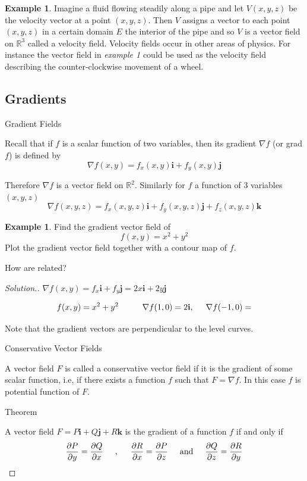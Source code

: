 \documentclass[11pt,a4paper]{article}
\theoremstyle{definition}
\newtheorem{exa}[thm]{Example}
\newenvironment{solution}
  {\renewcommand{\qedsymbol}{}\begin{proof}[\textit{Solution}.]}
  {\end{proof}}
\begin{document}
\begin{exa}
Imagine a fluid flowing steadily along a pipe and let $V(x,y,z)$ be the velocity vector at a point $(x,y,z)$. Then $V$ assigns a vector to each point $(x,y,z)$ in a certain domain $E$ the interior of the pipe and so $V$ is a vector field on $\mathbb{R}^3$ called a velocity field. Velocity fields occur in other areas of physics. For instance the vector field in \textit{example 1} could be used as the velocity field describing the counter-clockwise movement of a wheel.


\pagebreak
\end{exa}
{\color[wave]{485}\subsection{Gradients}}

{\color[wave]{485}Gradient Fields}


Recall that if $f$ is a scalar function of two variables, then its gradient $\nabla f$ (or grad $f$) is defined by $$\nabla f(x,y) = f_x(x,y)\textbf{i} + f_y(x,y) \textbf{j}$$

Therefore $\nabla f$ is a vector field on $\mathbb{R}^2$. Similarly for $f$ a function of 3 variables $(x,y,z)$ $$\nabla f(x,y,z) = f_x(x,y,z)\textbf{i} + f_y(x,y,z)\textbf{j} + f_z(x,y,z)\textbf{k}$$


\begin{exa}
Find the gradient vector field of $$f(x,y) = x^2 + y^2$$ Plot the gradient vector field together with a contour map of $f$.


How are related?
\end{exa}


\begin{solution}
$\displaystyle{\nabla f(x,y) = f_x\textbf{i} + f_y \textbf{j} = 2x\textbf{i} + 2y\textbf{j}}$

$$f(x,y) = x^2 + y^2\hspace{1cm} \nabla f(1,0) = 2\textbf{i},\hspace{0.5cm} \nabla f(-1,0)=$$


Note that the gradient vectors are perpendicular to the level curves.


{\color[wave]{485} Conservative Vector Fields}


A vector field $F$ is called a conservative vector field if it is the gradient of some scalar function, i.e, if there exists a function $f$ such that $F = \nabla f$. In this case $f$ is potential function of $F$.


{\color[wave]{485} Theorem}


A vector field $F = P\textbf{i} + Q \textbf{j} + R \textbf{k}$ is the gradient of a function $f$ if and only if $$\frac{\partial P}{\partial y} = \frac{\partial Q}{\partial x}\hspace{0.5cm}, \hspace{0.5cm} \frac{\partial R}{\partial x} = \frac{\partial P}{\partial z}\hspace{0.5cm} \text{and}\hspace{0.5cm} \frac{\partial Q}{\partial z}= \frac{\partial R}{\partial y}$$
\end{solution}
\end{document}
